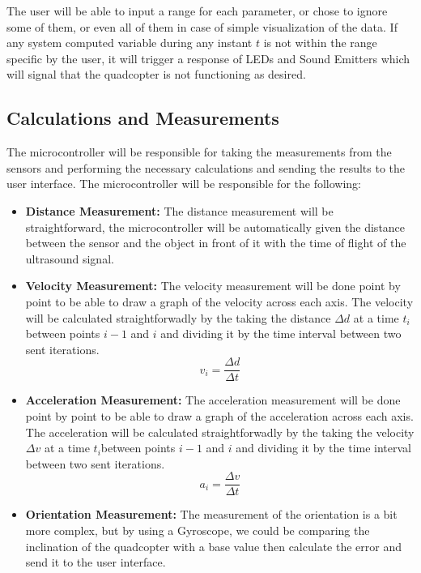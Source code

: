 \documentclass[12pt]{article}
\numberwithin{equation}{section}
\begin{document}
The user will be able to input a range for each parameter, or chose to ignore some of them, or even all of them in case of simple visualization of the data. If any system computed variable during any instant $t$ is not within the range specific by the user, it will trigger a response of LEDs and Sound Emitters which will signal that the quadcopter is not functioning as desired.

\subsection{Calculations and Measurements}
The microcontroller will be responsible for taking the measurements from the sensors and performing the necessary calculations and sending the results to the user interface. The microcontroller will be responsible for the following:

\begin{itemize}
  \item \textbf{Distance Measurement:} The distance measurement will be straightforward, the microcontroller will be automatically given the distance between the sensor and the object in front of it with the time of flight of the ultrasound signal.
  \item \textbf{Velocity Measurement:} The velocity measurement will be done point by point to be able to draw a graph of the velocity across each axis. The velocity will be calculated straightforwadly by the taking the distance $\Delta d$ at a time $t_i$ between points $i-1$ and $i$ and dividing it by the time interval between two sent iterations.
    \begin{equation}
      v_i = \frac{\Delta d}{\Delta t}
    \end{equation}  
  \item \textbf{Acceleration Measurement:} The acceleration measurement will be done point by point to be able to draw a graph of the acceleration across each axis. The acceleration will be calculated straightforwadly by the taking the velocity $\Delta v$ at a time $t_i$between points $i-1$ and $i$ and dividing it by the time interval between two sent iterations.
    \begin{equation}
      a_i = \frac{\Delta v}{\Delta t}
    \end{equation}
  \item \textbf{Orientation Measurement:} The measurement of the orientation is a bit more complex, but by using a Gyroscope, we could be comparing the inclination of the quadcopter with a base value then calculate the error and send it to the user interface.
\end{itemize}
\end{document}
